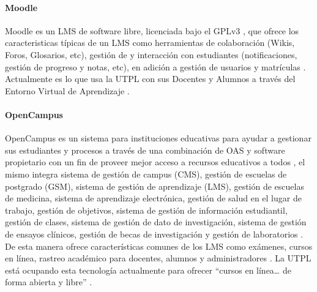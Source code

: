 \paragraph{Moodle}
Moodle es un LMS de software libre, licenciada bajo el GPLv3 \citep{MOODLE-GIT-License},  que ofrece los caracteristicas típicas de un LMS como herramientas de colaboración (Wikis, Foros, Glosarios, etc), gestión de y interacción con estudiantes (notificaciones, gestión de progreso y notas, etc), en adición a gestión de usuarios y matrículas \citep{MOODLE-DOCS-Features}. Actualmente es lo que usa la UTPL con sus Docentes y Alumnos a través del Entorno Virtual de Aprendizaje \citep{Lopez-Jorge}.

\paragraph{OpenCampus}
OpenCampus es un sistema para instituciones educativas para ayudar a gestionar sus estudiantes y procesos a través de una combinación de OAS y software propietario con un fin de proveer mejor acceso a recursos educativos a todos \citep{OpenCampus-Tecnology}, el mismo integra sistema de gestión de campus (CMS), gestión de escuelas de postgrado (GSM), sistema de gestión de aprendizaje (LMS), gestión de escuelas de medicina, sistema de aprendizaje electrónica, gestión de salud en el lugar de trabajo, gestión de objetivos, sistema de gestión de información estudiantil, gestión de clases, sistema de gestión de dato de investigación, sistema de gestión de ensayos clínicos, gestión de becas de investigación y gestión de laboratorios \citep{OpenCampus-Home}. De esta manera ofrece características comunes de los LMS como exámenes, cursos en línea, rastreo académico para docentes, alumnos y administradores \citep{OpenCampus-Tecnology} \citep{OpenCampus-Universities}. La UTPL está ocupando esta tecnología actualmente para ofrecer “cursos en línea… de forma abierta y libre” \citep{UTPL-OpenCampus}.

